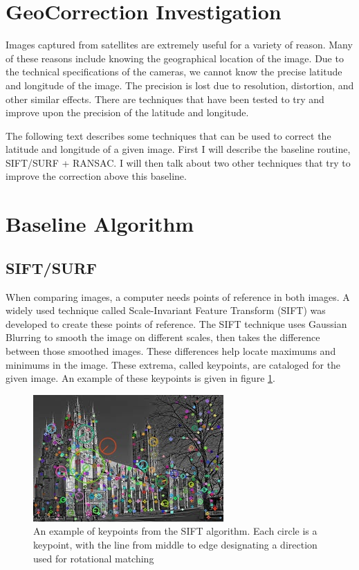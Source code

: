 \documentclass[12pt]{article} %
\begin{document}
\section {GeoCorrection Investigation}
	Images captured from satellites are extremely useful for a variety of reason. Many of these reasons include knowing the geographical location of the image. Due to the technical specifications of the cameras, we cannot know the precise latitude and longitude of the image. The precision is lost due to resolution, distortion, and other similar effects. There are techniques that have been tested to try and improve upon the precision of the latitude and longitude.

	The following text describes some techniques that can be used to correct the latitude and longitude of a given image. First I will describe the baseline routine, SIFT/SURF + RANSAC. I will then talk about two other techniques that try to improve the correction above this baseline.

\section{Baseline Algorithm}

\subsection{SIFT/SURF}
	When comparing images, a computer needs points of reference in both images. A widely used technique called Scale-Invariant Feature Transform (SIFT) was developed to create these points of reference. The SIFT technique uses Gaussian Blurring  to smooth the image on different scales, then takes the difference between those smoothed images. These differences help locate maximums and minimums in the image.
	These extrema, called keypoints, are cataloged for the given image. An example of these keypoints is given in figure \ref{fig:Keypoints}.

\begin{figure}[h]
\includegraphics[width=\textwidth]{sift_keypoints.jpeg} 
\caption{An example of keypoints from the SIFT algorithm. Each circle is a keypoint, with the line from middle to edge designating a direction used for rotational matching}
\label{fig:Keypoints}
\end{figure}
\end{document}
